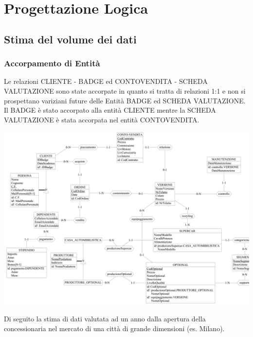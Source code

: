 \documentclass[11pt]{article}
\begin{document}
\newpage

\section{Progettazione Logica}

\subsection{Stima del volume dei dati}

\subsubsection*{Accorpamento di Entità}

Le relazioni CLIENTE - BADGE ed CONTOVENDITA - SCHEDA VALUTAZIONE sono
state accorpate in quanto si tratta di relazioni 1:1 e non si
prospettano variziani future delle Entità BADGE ed SCHEDA
VALUTAZIONE. Il BADGE è stato accorpato alla entità CLIENTE mentre
la SCHEDA VALUTAZIONE è stata accorpata nel entità CONTOVENDITA.

\begin{center}
    \includegraphics[scale=0.48, angle=90]{images/fullSchemes/finalAccorpamenti.png}
\end{center}

Di seguito la stima di dati valutata ad un anno dalla apertura della
concessionaria nel mercato di una città di grande dimensioni (es. Milano). 
\end{document}
